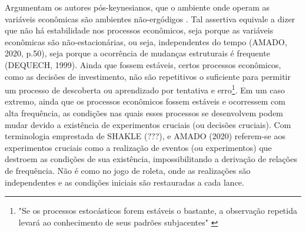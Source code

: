 Argumentam os autores pós-keynesianos, que o ambiente onde operam as variáveis econômicas são ambientes não-ergódigos \parencite{carvalho_keynes_2020}. Tal assertiva equivale a dizer que não há estabilidade nos processos econômicos, seja porque as variáveis econômicas são não-estacionárias, ou seja, independentes do tempo (AMADO, 2020, p.50), seja porque a ocorrência de mudanças estruturais é frequente (DEQUECH, 1999). Ainda que fossem estáveis, certos processos econômicos, como as decisões de investimento, não são repetitivos o suficiente para permitir um processo de descoberta ou aprendizado por tentativa e erro\footnote{"Se os processos estocásticos forem estáveis o bastante, a observação repetida levará ao conhecimento de seus padrões subjacentes" \parencite[pg. 20]{carvalho_keynes_2020}}. Em um caso extremo, ainda que os processos econômicos fossem estáveis e ocorressem com alta frequência, as condições nas quais esses processos se desenvolvem podem mudar devido a existência de experimentos cruciais (ou decisões cruciais). Com terminologia emprestada de SHAKLE (???), \textcite{carvalho_keynes_2020} e AMADO (2020) referem-se aos experimentos cruciais como a realização de eventos (ou experimentos) que destroem as condições de sua existência, impossibilitando a derivação de relações de frequência. Não é como no jogo de roleta, onde as realizações são independentes e as condições iniciais são restauradas a cada lance. 

